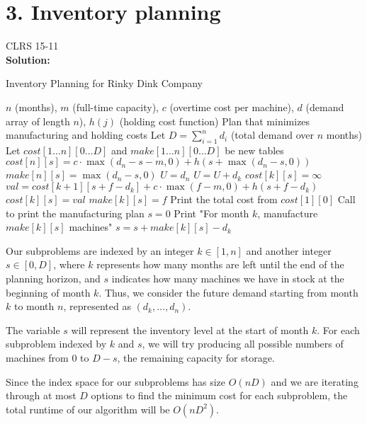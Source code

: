 \documentclass{article}
\begin{document}
\section*{3. Inventory planning} CLRS 15-11\\
\textbf{Solution:}
\begin{algorithm}
\caption{Inventory Planning for Rinky Dink Company}
\begin{algorithmic}[1]
\Require $n$ (months), $m$ (full-time capacity), $c$ (overtime cost per machine), 
         $d$ (demand array of length $n$), $h(j)$ (holding cost function)
\Ensure Plan that minimizes manufacturing and holding costs
\State Let $D = \sum_{i=1}^{n} d_i$ (total demand over $n$ months)
\State Let $cost[1 \ldots n][0 \ldots D]$ and $make[1 \ldots n][0 \ldots D]$ be new tables
    \State $cost[n][s] = c \cdot \max(d_n - s - m, 0) + h(s + \max(d_n - s, 0))$
    \State $make[n][s] = \max(d_n - s, 0)$
\EndFor
\State $U = d_n$
    \State $U = U + d_k$
        \State $cost[k][s] = \infty$
            \State $val = cost[k+1][s + f - d_k] + c \cdot \max(f - m, 0) + h(s + f - d_k)$
                \State $cost[k][s] = val$
                \State $make[k][s] = f$
            \EndIf
        \EndFor
    \EndFor
\EndFor
\State Print the total cost from $cost[1][0]$
\State Call  to print the manufacturing plan
    \State $s = 0$
        \State Print "For month $k$, manufacture $make[k][s]$ machines"
        \State $s = s + make[k][s] - d_k$
    \EndFor
\EndFunction
\end{algorithmic}
\end{algorithm}
Our subproblems are indexed by an integer \(k \in [1, n]\) and another integer \(s \in [0, D]\), where \(k\) represents how many months are left until the end of the planning horizon, and \(s\) indicates how many machines we have in stock at the beginning of month \(k\). Thus, we consider the future demand starting from month \(k\) to month \(n\), represented as \((d_k, \dots, d_n)\).

The variable \(s\) will represent the inventory level at the start of month \(k\). For each subproblem indexed by \(k\) and \(s\), we will try producing all possible numbers of machines from \(0\) to \(D - s\), the remaining capacity for storage.

Since the index space for our subproblems has size \(O(nD)\) and we are iterating through at most \(D\) options to find the minimum cost for each subproblem, the total runtime of our algorithm will be \(O(nD^2)\).
\pagebreak
\end{document}
